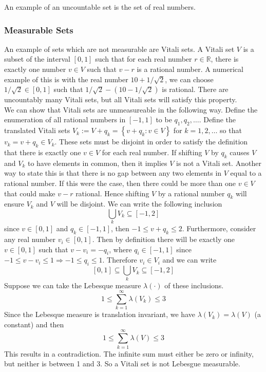 \documentclass[11pt]{report} %
\begin{document}
An example of an uncountable set is the set of real numbers.

\subsubsection{Measurable Sets}
An example of sets which are not measurable are Vitali sets. A Vitali set $V$ is a subset of the interval $\left[0, 1\right]$ such that for each real number $r \in \mathbb{R}$, there is exactly one number $v \in V$ such that $v - r$ is a rational number. A numerical example of this is with the real number $10 + 1/\sqrt{2}$, we can choose $1/\sqrt{2} \in \left[0, 1\right]$ such that $1/\sqrt{2} - \left(10 - 1/\sqrt{2}\right)$ is rational. There are uncountably many Vitali sets, but all Vitali sets will satisfy this property. \\

We can show that Vitali sets are unmeasureable in the following way. Define the enumeration of all rational numbers in $\left[-1, 1\right]$ to be $q_{1}, q_{2}, \dots$. Define the translated Vitali sets $V_{k} := V + q_{k} = \left\{v + q_{k}: v \in V\right\}$ for $k = 1, 2, \dots$ so that $v_{k} = v + q_{k} \in V_{k}$. These sets must be disjoint in order to satisfy the definition that there is exactly one $v \in V$ for each real number. If shifting $V$ by $q_{k}$ causes $V$ and $V_{k}$ to have elements in common, then it implies $V$ is not a Vitali set. Another way to state this is that there is no gap between any two elements in $V$ equal to a rational number. If this were the case, then there could be more than one $v \in V$ that could make $v - r$ rational. Hence shifting $V$ by a rational number $q_{k}$ will ensure $V_{k}$ and $V$ will be disjoint. We can write the following inclusion
\begin{equation}
\bigcup_{k}V_{k} \subseteq \left[-1, 2\right]
\end{equation}
since $v \in \left[0, 1\right]$ and $q_{k} \in \left[-1, 1\right]$, then $-1 \leq v + q_{k} \leq 2$. Furthermore, consider any real number $v_{i} \in \left[0, 1\right]$. Then by definition there will be exactly one $v \in \left[0, 1\right]$ such that $v - v_{i} = -q_{i}$, where $q_{i} \in \left[-1,1\right]$ since $-1 \leq v - v_{i} \leq 1 \Rightarrow -1 \leq q_{i} \leq 1$. Therefore $v_{i} \in V_{i}$ and we can write
\begin{equation}
\left[0, 1\right] \subseteq \bigcup_{k}V_{k} \subseteq \left[-1, 2\right]
\end{equation}
Suppose we can take the Lebesque measure $\lambda\left(\cdot\right)$ of these inclusions.
\begin{equation}
1 \leq \sum_{k = 1}^{\infty}\lambda\left(V_{k}\right) \leq 3
\end{equation}
Since the Lebesque measure is translation invariant, we have $\lambda\left(V_{k}\right) = \lambda\left(V\right)$ (a constant) and then
\begin{equation}
1 \leq \sum_{k = 1}^{\infty}\lambda\left(V\right) \leq 3
\end{equation}
This results in a contradiction. The infinite sum must either be zero or infinity, but neither is between 1 and 3. So a Vitali set is not Lebesgue measurable.
\end{document}
